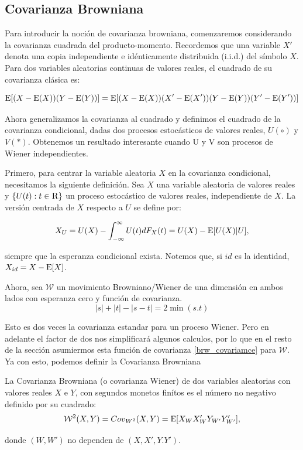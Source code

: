 	\subsection{Covarianza Browniana}
		
		Para introducir la noci\'on de covarianza browniana, comenzaremos considerando la covarianza cuadrada del producto-momento. Recordemos que una variable $X'$ denota una copia independiente e id\'enticamente distribuida (i.i.d.) del símbolo $X$. Para dos variables aleatorias continuas de valores reales, el cuadrado de su covarianza clásica es:

		$$\operatorname{E}[(X-\operatorname{E}(X))(Y-\operatorname{E}(Y))] = \operatorname{E}[(X-\operatorname{E}(X))(X'-\operatorname{E}(X'))(Y-\operatorname{E}(Y))(Y'-\operatorname{E}(Y'))]	$$

		Ahora generalizamos la covarianza al cuadrado y definimos el cuadrado de la covarianza condicional, dadas dos procesos estocásticos de valores reales, $U(\circ)$ y $V(*)$. Obtenemos un resultado interesante cuando U y V son procesos de Wiener independientes.


		Primero, para centrar la variable aleatoria $X$ en la covarianza condicional, necesitamos la siguiente definici\'on. Sea $X$ una variable aleatoria de valores reales y $\{U(t): t \in \textsc{R}\}$ un proceso estoc\'astico de valores reales, independiente de $X$. La versi\'on centrada de $X$ respecto a $U$ se define por:

		$$
		X_U = U(X)-\int_{-\infty}^{\infty}U(t)dF_X(t)=U(X)-\operatorname{E}[U(X)|U],
		$$

		siempre que la esperanza condicional exista. Notemos que, si $id$ es la identidad, $X_{id}=X-\operatorname{E}[X]$. 

		Ahora, sea $\mathcal{W}$ un movimiento Browniano/Wiener de una dimensi\'on en ambos lados con esperanza cero y funci\'on de covarianza.
		\begin{equation}\label{brw_covariamce}
			|s|+|t|-|s-t|=2\min(s.t)
		\end{equation}
			

		Esto es dos veces la covarianza estandar para un proceso Wiener. Pero en adelante el factor de dos nos simplificar\'a algunos calculos, por lo que en el resto de la secci\'on asumiermos esta funci\'on de covarianza \ref{brw_covariamce} para $\mathcal{W}$. Ya con esto, podemos definir la Covarianza Browniana 

		\begin{defn}
			La Covarianza Browniana (o covarianza Wiener) de dos variables aleatorias con valores reales $X$ e $Y$, con segundos monetos fin\'itos es el n\'umero no negativo definido por su cuadrado:
			\begin{equation}\label{brw_cov}
				\mathcal{W}^2(X,Y)={Cov}_{{W}^2}(X,Y)=\operatorname{E}[X_{W}X'_{W}Y_{W'}Y'_{W'}],
			\end{equation}

			donde $({W},{W'})$ no dependen de $(X,X',Y.Y')$.
		\end{defn}

